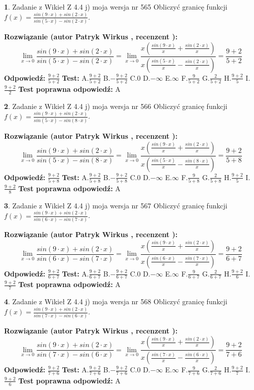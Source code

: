 \documentclass[12pt, a4paper]{article}
\theoremstyle{definition} %
\newtheorem{zad}{}
\newcommand{\zadStart}[1]{\begin{zad}#1\newline}
\newcommand{\zadStop}{\end{zad}}
\newcommand{\rozwStart}[2]{\noindent \textbf{Rozwiązanie (autor #1 , recenzent #2): }\newline}
\newcommand{\rozwStop}{\newline}
\newcommand{\odpStart}{\noindent \textbf{Odpowiedź:}\newline}
\newcommand{\odpStop}{\newline}
\newcommand{\testStart}{\noindent \textbf{Test:}\newline}
\newcommand{\testStop}{\newline}
\newcommand{\kluczStart}{\noindent \textbf{Test poprawna odpowiedź:}\newline}
\newcommand{\kluczStop}{\newline}
\begin{document}
\zadStart{Zadanie z Wikieł Z 4.4 j) moja wersja nr 565}
Obliczyć granicę funkcji $f(x)=\frac{sin(9\cdot x) +sin(2\cdot x)}{sin(5\cdot x) -sin(2\cdot x)}$.
\zadStop
\rozwStart{Patryk Wirkus}{}
$$\lim\limits_{x\to 0}\frac{sin(9\cdot x) +sin(2\cdot x)}{sin(5\cdot x) -sin(2\cdot x)}=\lim\limits_{x\to 0}\frac{x(\frac{sin(9\cdot x)}{x}+\frac{sin(2\cdot x)}{x})}{x(\frac{sin(5\cdot x)}{x}-\frac{sin(2\cdot x)}{x})}=\frac{9+2}{5+2}$$
\rozwStop
\odpStart
$\frac{9+2}{5+2}$
\odpStop
\testStart
A.$\frac{9+2}{5+2}$
B.$-\frac{9+2}{5+2}$
C.$0$
D.$-\infty$
E.$\infty$
F.$\frac{9}{5+2}$
G.$\frac{2}{5+2}$
H.$\frac{9+2}{5}$
I.$\frac{9+2}{2}$
\testStop
\kluczStart
A
\kluczStop



\zadStart{Zadanie z Wikieł Z 4.4 j) moja wersja nr 566}
Obliczyć granicę funkcji $f(x)=\frac{sin(9\cdot x) +sin(2\cdot x)}{sin(5\cdot x) -sin(8\cdot x)}$.
\zadStop
\rozwStart{Patryk Wirkus}{}
$$\lim\limits_{x\to 0}\frac{sin(9\cdot x) +sin(2\cdot x)}{sin(5\cdot x) -sin(8\cdot x)}=\lim\limits_{x\to 0}\frac{x(\frac{sin(9\cdot x)}{x}+\frac{sin(2\cdot x)}{x})}{x(\frac{sin(5\cdot x)}{x}-\frac{sin(8\cdot x)}{x})}=\frac{9+2}{5+8}$$
\rozwStop
\odpStart
$\frac{9+2}{5+8}$
\odpStop
\testStart
A.$\frac{9+2}{5+8}$
B.$-\frac{9+2}{5+8}$
C.$0$
D.$-\infty$
E.$\infty$
F.$\frac{9}{5+8}$
G.$\frac{2}{5+8}$
H.$\frac{9+2}{5}$
I.$\frac{9+2}{8}$
\testStop
\kluczStart
A
\kluczStop



\zadStart{Zadanie z Wikieł Z 4.4 j) moja wersja nr 567}
Obliczyć granicę funkcji $f(x)=\frac{sin(9\cdot x) +sin(2\cdot x)}{sin(6\cdot x) -sin(7\cdot x)}$.
\zadStop
\rozwStart{Patryk Wirkus}{}
$$\lim\limits_{x\to 0}\frac{sin(9\cdot x) +sin(2\cdot x)}{sin(6\cdot x) -sin(7\cdot x)}=\lim\limits_{x\to 0}\frac{x(\frac{sin(9\cdot x)}{x}+\frac{sin(2\cdot x)}{x})}{x(\frac{sin(6\cdot x)}{x}-\frac{sin(7\cdot x)}{x})}=\frac{9+2}{6+7}$$
\rozwStop
\odpStart
$\frac{9+2}{6+7}$
\odpStop
\testStart
A.$\frac{9+2}{6+7}$
B.$-\frac{9+2}{6+7}$
C.$0$
D.$-\infty$
E.$\infty$
F.$\frac{9}{6+7}$
G.$\frac{2}{6+7}$
H.$\frac{9+2}{6}$
I.$\frac{9+2}{7}$
\testStop
\kluczStart
A
\kluczStop



\zadStart{Zadanie z Wikieł Z 4.4 j) moja wersja nr 568}
Obliczyć granicę funkcji $f(x)=\frac{sin(9\cdot x) +sin(2\cdot x)}{sin(7\cdot x) -sin(6\cdot x)}$.
\zadStop
\rozwStart{Patryk Wirkus}{}
$$\lim\limits_{x\to 0}\frac{sin(9\cdot x) +sin(2\cdot x)}{sin(7\cdot x) -sin(6\cdot x)}=\lim\limits_{x\to 0}\frac{x(\frac{sin(9\cdot x)}{x}+\frac{sin(2\cdot x)}{x})}{x(\frac{sin(7\cdot x)}{x}-\frac{sin(6\cdot x)}{x})}=\frac{9+2}{7+6}$$
\rozwStop
\odpStart
$\frac{9+2}{7+6}$
\odpStop
\testStart
A.$\frac{9+2}{7+6}$
B.$-\frac{9+2}{7+6}$
C.$0$
D.$-\infty$
E.$\infty$
F.$\frac{9}{7+6}$
G.$\frac{2}{7+6}$
H.$\frac{9+2}{7}$
I.$\frac{9+2}{6}$
\testStop
\kluczStart
A
\kluczStop
\end{document}
